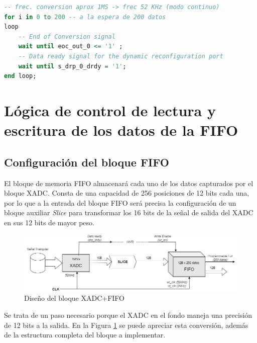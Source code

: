 \begin{lstlisting}[language=VHDL, style=mystyle, caption={Bucle de conversión de los 200 datos}]
-- frec. conversion aprox 1MS -> frec 52 KHz (modo continuo)
for i in 0 to 200 -- a la espera de 200 datos 
loop     
    -- End of Conversion signal 
    wait until eoc_out_0 <= '1' ; 
    -- Data ready signal for the dynamic reconfiguration port  
    wait until s_drp_0_drdy = '1'; 
end loop;
\end{lstlisting}

\section{Lógica de control de lectura y escritura de los datos de la FIFO}

\subsection{Configuración del bloque FIFO}
\label{section:fifo}

El bloque de memoria FIFO almacenará cada uno de los datos capturados por el bloque XADC. Consta de una capacidad de 256 posiciones de 12 bits cada una, por lo que a la entrada del bloque FIFO será precisa la configuración de un bloque auxiliar \textit{Slice} para transformar los 16 bits de la señal de salida del XADC en sus 12 bits de mayor peso. 

\vspace{3mm}

\begin{figure}[h]
    \centering
    \includegraphics[width=1\textwidth]{img/diseno/xadc_fifo.drawio.PNG}
    \caption{Diseño del bloque XADC+FIFO}
    \label{fig:xadc_fifo}
\end{figure}
    
\vspace{3mm}

Se trata de un paso necesario porque el XADC en el fondo maneja una precisión de 12 bits a la salida. En la Figura \ref{fig:xadc_fifo} se puede apreciar esta conversión, además de la estructura completa del bloque a implementar.

